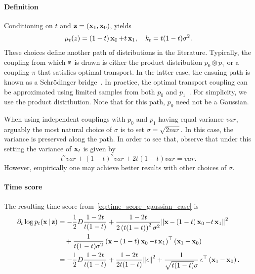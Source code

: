 \paragraph{Definition}
Conditioning on $t$ and $\operatorname{\mathbf{z}} = (\operatorname{\mathbf{x}}_1, \operatorname{\mathbf{x}}_0)$, yields
\begin{align}
    \mu_t(z) = (1 - t) \operatorname{\mathbf{x}}_0 + t \operatorname{\mathbf{x}}_1,
    \quad
    k_t = t (1 - t) \sigma^{2}.
\end{align}
These choices define another path of distributions in the literature. Typically, the coupling from which $\operatorname{\mathbf{z}}$ is drawn is either the product distribution $p_0 \otimes p_1$ or a coupling $\pi$ that satisfies optimal transport.  In the latter case, the ensuing path is known as a Schrödinger bridge~\citep{Follmer1988,tong2024schrodingerbridge}. In practice, the optimal transport coupling can be approximated using limited samples from both $p_0$ and $p_1$~\citep{pooladian2023conditionalflowmatching,tong2024conditionalflowmatching}. For simplicity, we use the product distribution. Note that for this path, $p_0$ need not be a Gaussian. 

When using independent couplings with $p_{0}$ and $p_{1}$ having equal variance $var$, arguably the most natural choice of $\sigma$ is to set $\sigma = \sqrt{2 var}$. In this case, the variance is preserved along the path. In order to see that, observe that under this setting the variance of $\operatorname{\mathbf{x}}_{t}$ is given by
\begin{equation*}
t^{2}var + (1-t)^{2}var + 2t(1-t)var = var.
\end{equation*}
However, empirically one may achieve better results with other choices of $\sigma$.

\paragraph{Time score}
The resulting time score from~\eqref{eq:time_score_gaussian_case} is
\begin{align}
    \partial_{t}\log p_{t}(\operatorname{\mathbf{x}}|\operatorname{\mathbf{z}})
    &= 
    -\frac{1}{2}D\frac{1-2t}{t(1-t)} + \frac{1-2t}{2\left(t(1-t)\right)^{2}\sigma^{2}}\norm{\operatorname{\mathbf{x}}-\left(1-t\right)\operatorname{\mathbf{x}}_{0}-t\operatorname{\mathbf{x}}_{1}}^{2}\\
&\quad +\frac{1}{t(1-t)\sigma^{2}}\left(\operatorname{\mathbf{x}}-\left(1-t\right)\operatorname{\mathbf{x}}_{0}-t\operatorname{\mathbf{x}}_{1}\right)^{\top}\left(\operatorname{\mathbf{x}}_{1}-\operatorname{\mathbf{x}}_{0}\right)\\
&= -\frac{1}{2}D\frac{1-2t}{t(1-t)} + \frac{1-2t}{2t(1-t)}\norm{\operatorname{\mathbf{\epsilon}}}^{2} +\frac{1}{\sqrt{t(1-t)}\sigma}\operatorname{\mathbf{\epsilon}}^{\top}\left(\operatorname{\mathbf{x}}_{1}-\operatorname{\mathbf{x}}_{0}\right).
\end{align}

